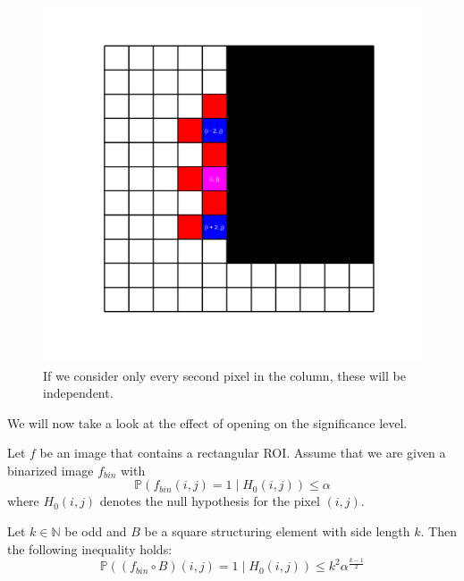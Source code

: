 \documentclass{beamer}
\begin{document}
\begin{frame}
	\begin{figure}[h]
		\includegraphics[width=0.6\linewidth]{Morphology/IndependentPoints}
		\caption[Independent points]{If we consider only every second pixel in the column, these will be independent.}
		\label{fig:IndependentPoints}
	\end{figure}
\end{frame}

\begin{frame}
	We will now take a look at the effect of opening on the significance level.
	
	\begin{theorem}
		Let $f$ be an image that contains a rectangular ROI. Assume that we are given a binarized image $f_{bin}$ with
		\begin{equation*}
			\mathbb{P}(f_{bin}(i, j) = 1 \mid H_0(i, j)) \leq \alpha
		\end{equation*}
		where $H_0(i, j)$ denotes the null hypothesis for the pixel $(i, j)$.
		
		Let $k \in \mathbb{N}$ be odd and $B$ be a square structuring element with side length $k$. Then the following inequality holds:
		\begin{equation*}
			\mathbb{P}((f_{bin} \circ B)(i, j) = 1 \mid H_0(i, j)) \leq k^2 \alpha^\frac{k - 1}{2}
		\end{equation*}
	\end{theorem}
\end{frame}
\end{document}
